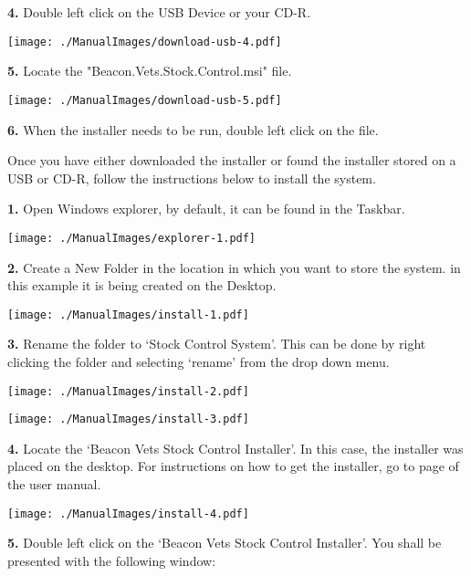 \vspace{5mm}
\textbf{4.} Double left click on the USB Device or your CD-R.

\texttt{[image: ./ManualImages/download-usb-4.pdf]}

\vspace{5mm}
\textbf{5.} Locate the "Beacon.Vets.Stock.Control.msi" file.

\texttt{[image: ./ManualImages/download-usb-5.pdf]}

\vspace{5mm}
\textbf{6.} When the installer needs to be run, double left click on the file.


\vspace{5mm}

Once you have either downloaded the installer or found the installer stored on a USB or CD-R, follow the instructions below to install the system.

\textbf{1.} Open Windows explorer, by default, it can be found in the Taskbar.

\texttt{[image: ./ManualImages/explorer-1.pdf]}

\textbf{2.} Create a New Folder in the location in which you want to store the system. in this example it is being created on the Desktop.

\texttt{[image: ./ManualImages/install-1.pdf]}

\pagebreak

\textbf{3.} Rename the folder to `Stock Control System'. This can be done by right clicking the folder and selecting `rename' from the drop down menu.

\texttt{[image: ./ManualImages/install-2.pdf]}

\texttt{[image: ./ManualImages/install-3.pdf]}

\pagebreak

\textbf{4.} Locate the `Beacon Vets Stock Control Installer'. In this case, the installer was placed on the desktop. For instructions on how to get the installer, go to page \pageref{fig:System Installation} of the user manual.

\texttt{[image: ./ManualImages/install-4.pdf]}

\pagebreak

\textbf{5.} Double left click on the `Beacon Vets Stock Control Installer'. You shall be presented with the following window:


